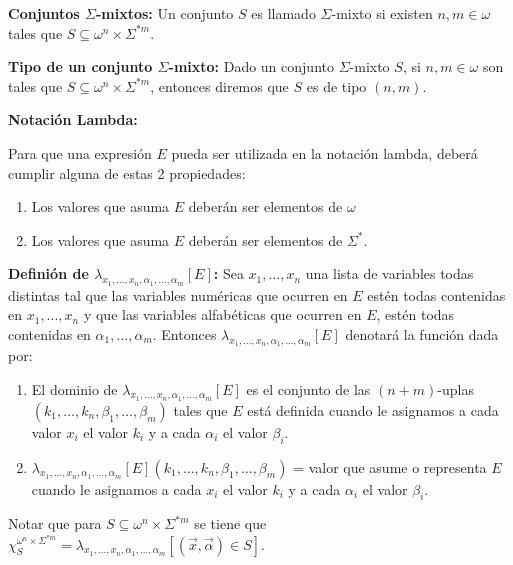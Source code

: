 \documentclass{article}
\begin{document}
\begin{flushleft}
\textbf{Conjuntos $\Sigma$-mixtos:} Un conjunto $S$ es llamado $\Sigma$-mixto si existen $n, m \in \omega$ tales que $S \subseteq \omega^n \times \Sigma^{*m}$.\linebreak

\textbf{Tipo de un conjunto $\Sigma$-mixto:} Dado un conjunto $\Sigma$-mixto $S$, si $n, m \in \omega$ son tales que $S \subseteq \omega^n \times \Sigma^{*m}$, entonces diremos que $S$ es de tipo $(n, m)$.\linebreak

\textbf{Notación Lambda:} \linebreak

Para que una expresión $E$ pueda ser utilizada en la notación lambda, deberá cumplir alguna de estas 2 propiedades:
\begin{enumerate}
    \item Los valores que asuma $E$ deberán ser elementos de $\omega$
    \item Los valores que asuma $E$ deberán ser elementos de $\Sigma^*$.
\end{enumerate}

\textbf{Definión de $\lambda_{x_1, ..., x_n, \alpha_1, ..., \alpha_m}[E]$:} Sea $x_1, ..., x_n$ una lista de variables todas distintas tal que las variables numéricas que ocurren en $E$ estén todas contenidas en $x_1, ..., x_n$ y que las variables alfabéticas que ocurren en $E$, estén todas contenidas en $\alpha_1, ..., \alpha_m$. Entonces $\lambda_{x_1, ..., x_n, \alpha_1, ..., \alpha_m}[E]$ denotará la función dada por:
\begin{enumerate}
    \item El dominio de $\lambda_{x_1, ..., x_n, \alpha_1, ..., \alpha_m}[E]$ es el conjunto de las $(n+m)$-uplas $(k_1, ..., k_n, \beta_1, ..., \beta_m)$ tales que $E$ está definida cuando le asignamos a cada valor $x_i$ el valor $k_i$ y a cada $\alpha_i$ el valor $\beta_i$.
    \item $\lambda_{x_1, ..., x_n, \alpha_1, ..., \alpha_m}[E](k_1, ..., k_n, \beta_1, ..., \beta_m)$ = valor que asume o representa $E$ cuando le asignamos a cada $x_i$ el valor $k_i$ y a cada $\alpha_i$ el valor $\beta_i$.
\end{enumerate}

Notar que para $S \subseteq \omega^n \times \Sigma^{*m}$ se tiene que $\chi_S^{\omega^n \times \Sigma^{*m}} = \lambda_{x_1, ..., x_n, \alpha_1, ..., \alpha_m}[(\overrightarrow{x}, \overrightarrow{\alpha}) \in S]$.

\end{flushleft}
\end{document}
